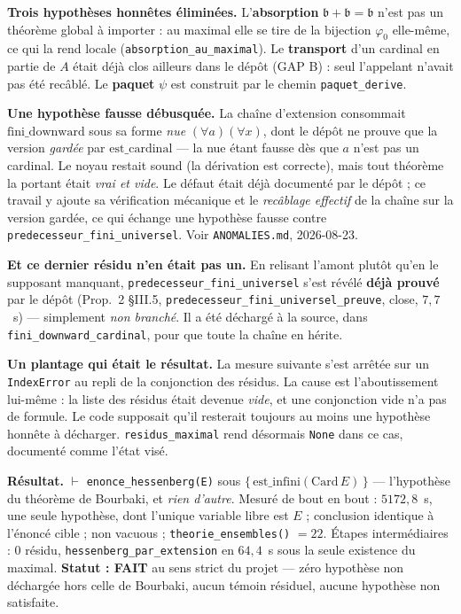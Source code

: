 \textbf{Trois hypothèses honnêtes éliminées.} L'\textbf{absorption}
$\mathfrak{b}+\mathfrak{b}=\mathfrak{b}$ n'est pas un théorème global à importer :
au maximal elle se tire de la bijection $\varphi_0$ elle-même, ce qui la rend locale
(\texttt{absorption\_au\_maximal}). Le \textbf{transport} d'un cardinal en partie de
$A$ était déjà clos ailleurs dans le dépôt (GAP B) : seul l'appelant n'avait pas été
recâblé. Le \textbf{paquet} $\psi$ est construit par le chemin
\texttt{paquet\_derive}.

\textbf{Une hypothèse fausse débusquée.} La chaîne d'extension consommait
$\mathrm{fini\_downward}$ sous sa forme \emph{nue} $(\forall a)(\forall x)$, dont le
dépôt ne prouve que la version \emph{gardée} par $\mathrm{est\_cardinal}$ --- la nue
étant fausse dès que $a$ n'est pas un cardinal. Le noyau restait sound (la dérivation
est correcte), mais tout théorème la portant était \emph{vrai et vide}. Le défaut
était déjà documenté par le dépôt ; ce travail y ajoute sa vérification mécanique
et le \emph{recâblage effectif} de la chaîne sur la version gardée, ce qui échange
une hypothèse fausse contre \texttt{predecesseur\_fini\_universel}. Voir
\texttt{ANOMALIES.md}, 2026-08-23.

\textbf{Et ce dernier résidu n'en était pas un.} En relisant l'amont plutôt qu'en
le supposant manquant, \texttt{predecesseur\_fini\_universel} s'est révélé
\textbf{déjà prouvé} par le dépôt (Prop.~2 §III.5,
\texttt{predecesseur\_fini\_universel\_preuve}, close, $7{,}7$~s) --- simplement
\emph{non branché}. Il a été déchargé à la source, dans
\texttt{fini\_downward\_cardinal}, pour que toute la chaîne en hérite.

\textbf{Un plantage qui était le résultat.} La mesure suivante s'est arrêtée sur
un \texttt{IndexError} au repli de la conjonction des résidus. La cause est
l'aboutissement lui-même : la liste des résidus était devenue \emph{vide}, et une
conjonction vide n'a pas de formule. Le code supposait qu'il resterait toujours au
moins une hypothèse honnête à décharger. \texttt{residus\_maximal} rend désormais
\texttt{None} dans ce cas, documenté comme l'état visé.

\textbf{Résultat.} $\vdash$ \texttt{enonce\_hessenberg(E)} sous
$\{\,\mathrm{est\_infini}(\mathrm{Card}\,E)\,\}$ --- l'hypothèse du théorème de
Bourbaki, et \emph{rien d'autre}. Mesuré de bout en bout : $5172{,}8$~s, une seule
hypothèse, dont l'unique variable libre est $E$ ; conclusion identique à l'énoncé
cible ; non vacuous ; \texttt{theorie\_ensembles()} $= 22$. Étapes intermédiaires :
$0$ résidu, \texttt{hessenberg\_par\_extension} en $64{,}4$~s sous la seule
existence du maximal. \textbf{Statut : FAIT} au sens strict du projet --- zéro
hypothèse non déchargée hors celle de Bourbaki, aucun témoin résiduel, aucune
hypothèse non satisfaite.


